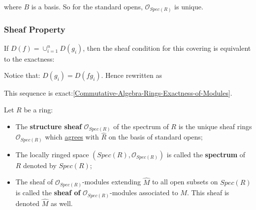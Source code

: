 \documentclass[Total.tex]{subfiles}
\begin{document}
				where $B$ is a basis. So for the standard opens, $\mathcal{O}_{Spec(R)}$ is unique.
			\subsubsection{Sheaf Property}
			If $D(f)=\cup_{i=1}^n D(g_i)$, then the sheaf condition for this covering is equivalent to the exactness:
			\begin{center}
			\end{center}
			Notice that: $D(g_i)=D(fg_i)$. Hence rewritten as
			\begin{center}
			\end{center}
			This sequence is exact:\ref{Commutative-Algebra-Rings-Exactness-of-Modules}.
			
			\begin{Def}
				Let $R$ be a ring:
				
				\begin{itemize}
					\item The \textbf{structure sheaf} $\mathcal{O}_{Spec(R)}$ of the spectrum of $R$ is the unique sheaf rings $\mathcal{O}_{Spec(R)}$ which \underline{agrees} with $\hat{R}$ on the basis of standard opens;
					\item The locally ringed space $(Spec(R),\mathcal{O}_{Spec(R)})$ is called the \textbf{spectrum} of $R$ denoted by $Spec(R)$;
					\item The sheaf of $\mathcal{O}_{Spec(R)}$-modules extending $\hat{M}$ to all open subsets on $Spec(R)$ is called the \textbf{sheaf of }$\mathcal{O}_{Spec(R)}$-modules associated to $M$. This sheaf is denoted $\hat{M}$ as well.
				\end{itemize}
			\end{Def}
			
\end{document}
